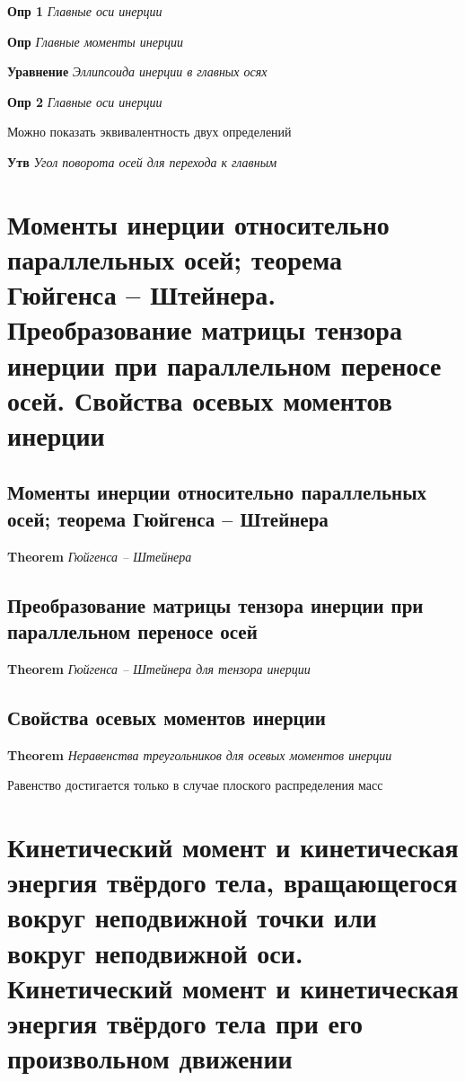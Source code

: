 \documentclass[a4paper, 14pt]{article}
\begin{document}
    \textbf{Опр 1} \textit{Главные оси инерции}
    
    \textbf{Опр} \textit{Главные моменты инерции}
    
    \textbf{Уравнение} \textit{Эллипсоида инерции в главных осях}
    
    \textbf{Опр 2} \textit{Главные оси инерции}
    
    Можно показать эквивалентность двух определений
    
    \textbf{Утв} \textit{Угол поворота осей для перехода к главным}
    
    \section{Моменты инерции относительно параллельных осей; теорема Гюйгенса – Штейнера.
    Преобразование матрицы тензора инерции при параллельном переносе осей.
    Свойства осевых моментов инерции}
    
    \subsection{Моменты инерции относительно параллельных осей; теорема Гюйгенса – Штейнера}
    
    \textbf{Theorem} \textit{Гюйгенса – Штейнера}
    
    \subsection{Преобразование матрицы тензора инерции при параллельном переносе осей}
    
    \textbf{Theorem} \textit{Гюйгенса – Штейнера для тензора инерции}
    
    \subsection{Свойства осевых моментов инерции}
    
    \textbf{Theorem} \textit{Неравенства треугольников для осевых моментов инерции}
    
    Равенство достигается только в случае плоского распределения масс
    
    \section{Кинетический момент и кинетическая энергия твёрдого тела, вращающегося вокруг неподвижной точки или
    вокруг неподвижной оси.
    Кинетический момент и кинетическая энергия твёрдого тела при его произвольном движении}
    
\end{document}

